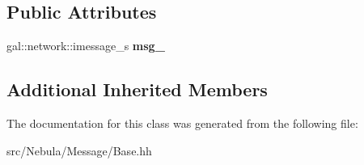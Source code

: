 \subsection*{Public Attributes}
\begin{DoxyCompactItemize}
\item 
\hypertarget{classNeb_1_1Message_1_1IBase_ad136b72f57b2130c836c7ba451124696}{gal\-::network\-::imessage\-\_\-s {\bfseries msg\-\_\-}}\label{classNeb_1_1Message_1_1IBase_ad136b72f57b2130c836c7ba451124696}

\end{DoxyCompactItemize}
\subsection*{Additional Inherited Members}


The documentation for this class was generated from the following file\-:\begin{DoxyCompactItemize}
\item 
src/\-Nebula/\-Message/Base.\-hh\end{DoxyCompactItemize}
